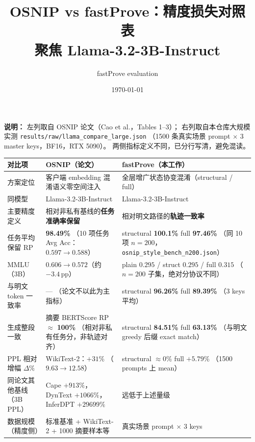 \documentclass[11pt,a4paper]{article}
\title{\textbf{OSNIP vs fastProve：精度损失对照表}\\
\large 聚焦 Llama-3.2-3B-Instruct}
\author{fastProve evaluation}
\date{\today}
\begin{document}
\maketitle
\vspace{-1.2em}

\noindent
{\small\color{note}
\textbf{说明：} 左列取自 OSNIP 论文（Cao et al.，Tables 1--3）；
右列取自本仓库大规模实测
\texttt{results/raw/llama\_compare\_large.json}
（1500 条真实场景 prompt $\times$ 3 master keys，BF16，RTX 5090）。
两侧指标定义不同，已分行写清，避免混读。
}

\vspace{1.0em}

\begin{center}
\renewcommand{\arraystretch}{1.35}
\begin{tabular}{@{}>{\raggedright\arraybackslash}p{3.4cm}
  >{\raggedright\arraybackslash}p{5.6cm}
  >{\raggedright\arraybackslash}p{5.6cm}@{}}
\toprule
\rowcolor{headerbg}
\textbf{对比项} &
\textbf{OSNIP（论文）} &
\textbf{fastProve（本工作）} \\
\midrule
方案定位
  & 客户端 embedding 混淆语义零空间注入
  & 全层增广状态协变混淆（structural / full） \\
\addlinespace
同模型
  & Llama-3.2-3B-Instruct
  & Llama-3.2-3B-Instruct \\
\addlinespace
主要精度定义
  & 相对非私有基线的\textbf{任务准确率保留}
  & 相对明文路径的\textbf{轨迹一致率} \\
\addlinespace
任务平均保留 RP
  & \textbf{98.49\%}
    （10 项任务 Avg Acc：$0.597\to0.588$）
  & structural \textbf{100.1\%}
    \newline full \textbf{97.46\%}
    （同 10 项 $n{=}200$，\texttt{osnip\_style\_bench\_n200.json}） \\
\addlinespace
MMLU（3B）
  & $0.606\to0.572$（约 $-3.4$\,pp）
  & plain $0.295$ / struct $0.295$ / full $0.315$
    （$n{=}200$ 子集，绝对分协议不同） \\
\addlinespace
与明文 token 一致率
  & ---
    （论文不以此为主指标）
  & structural \textbf{96.26\%}
    \newline full \textbf{89.39\%}
    （3 keys 平均） \\
\addlinespace
生成整段一致
  & 摘要 BERTScore RP $\approx$ \textbf{100\%}
    （相对非私有任务分，非轨迹对齐）
  & structural \textbf{84.51\%}
    \newline full \textbf{63.13\%}
    （与明文 greedy 后缀 exact match） \\
\addlinespace
PPL 相对增幅 $\Delta\%$
  & WikiText-2：\textbf{$+31\%$}
    （$9.63\to12.58$）
  & structural \textbf{$\approx 0\%$}
    \newline full \textbf{$+5.79\%$}
    （1500 prompts 上 mean） \\
\addlinespace
同论文其他基线（3B PPL）
  & Cape $+913\%$，DynText $+1066\%$，
    InferDPT $+29699\%$
  & 远低于上述量级 \\
\addlinespace
数据规模（精度侧）
  & 标准基准 + WikiText-2 + 1000 摘要样本等
  & 1500 真实场景 prompt $\times$ 3 keys \\
\bottomrule
\end{tabular}
\end{center}
\end{document}
